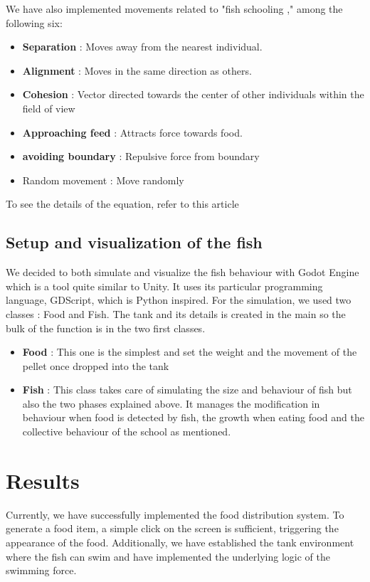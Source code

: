 \documentclass[9pt]{article}
\begin{document}
We have also implemented movements related to "fish schooling ," among the following six: 


\begin{itemize}
    \item \textbf{Separation} :  Moves away from the nearest individual.
    \item \textbf{Alignment} : Moves in the same direction as others.
    \item \textbf{Cohesion }: Vector directed towards the center of other individuals within the field of view
    \item  \textbf{Approaching feed} :  Attracts force towards food.
    \item \textbf{avoiding boundary} : Repulsive force from boundary 
    \item Random movement : Move randomly 
\end{itemize}

To see the details of the equation, refer to this article \cite{article}

\subsection{Setup and visualization of the fish}
We decided to both simulate and visualize the fish behaviour with Godot Engine which is a tool quite similar to Unity. It uses its particular programming language, GDScript, which is Python inspired. For the simulation, we used two classes : Food and Fish. The tank and its details is created in the main so the bulk of the function is in the two first classes.
\begin{itemize}
    \item \textbf{Food} : This one is the simplest and set the weight and the movement of the pellet once dropped into the tank
    \item \textbf{Fish} :  This class takes care of simulating the size and behaviour of fish but also the two phases explained above. It manages the modification in behaviour when food is detected by fish, the growth when eating food and the collective behaviour of the school as mentioned.
\end{itemize}   




\section{Results}

Currently, we have successfully implemented the food distribution system. To generate a food item, a simple click on the screen is sufficient, triggering the appearance of the food. Additionally, we have established the tank environment where the fish can swim and have implemented the underlying logic of the swimming force.
\end{document}
